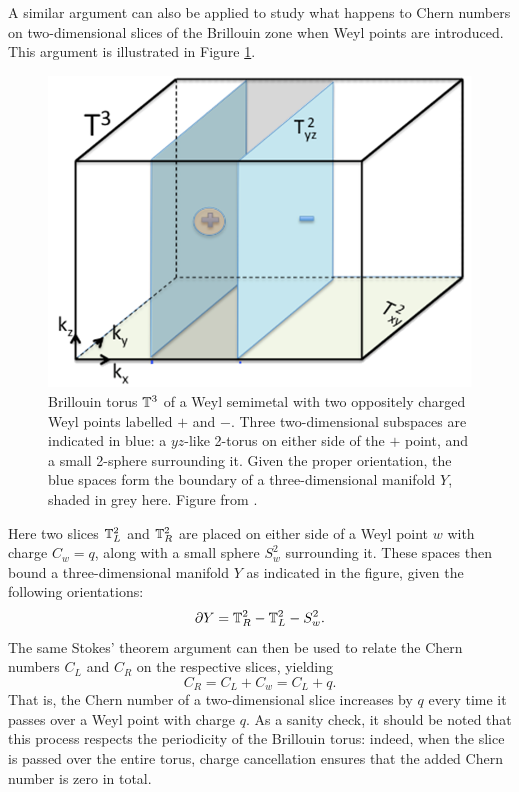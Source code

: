 A similar argument can also be applied to study what happens to Chern numbers on two-dimensional slices of the Brillouin zone when Weyl points are introduced. This argument is illustrated in Figure \ref{fig:Weyl-point-Stokes}.
\begin{figure}[htb!]
	\centering
	\includegraphics[width=.5\linewidth]{Images/Weyl-point-Stokes}
	\caption{
		Brillouin torus $\mathbb{T}^3$ of a Weyl semimetal with two oppositely charged Weyl points labelled $+$ and $-$. Three two-dimensional subspaces are indicated in blue: a $yz$-like 2-torus on either side of the $+$ point, and a small 2-sphere surrounding it. Given the proper orientation, the blue spaces form the boundary of a three-dimensional manifold $Y$, shaded in grey here.
		Figure from \cite{Mathai_math-review}. %
	}
	\label{fig:Weyl-point-Stokes}
\end{figure}
Here two slices $\mathbb{T}_L^2$ and $\mathbb{T}_R^2$ are placed on either side of a Weyl point $w$ with charge $C_w = q$, along with a small sphere $S_w^2$ surrounding it. These spaces then bound a three-dimensional manifold $Y$ as indicated in the figure, given the following orientations:
\[
	\partial Y = \mathbb{T}_R^2 - \mathbb{T}_L^2 - S_w^2.
\]
The same Stokes' theorem argument can then be used to relate the Chern numbers $C_L$ and $C_R$ on the respective slices, yielding
\[
	C_R = C_L + C_w = C_L + q.
\]
That is, the Chern number of a two-dimensional slice increases by $q$ every time it passes over a Weyl point with charge $q$. As a sanity check, it should be noted that this process respects the periodicity of the Brillouin torus: indeed, when the slice is passed over the entire torus, charge cancellation ensures that the added Chern number is zero in total.

